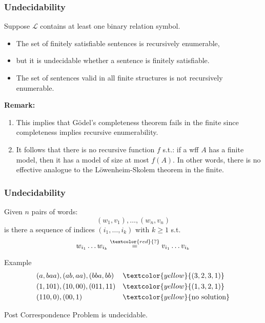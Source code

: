 \documentclass[UTF8,aspectratio=43,11pt,colorlinks,compress,openany]{beamer}%
\begin{document}
\begin{frame}\frametitle{Undecidability}
	\begin{theorem}
		Suppose $\mathscr{L}$ contains at least one binary relation symbol.
		\begin{itemize}
			\item The set of finitely satisfiable sentences is recursively enumerable,
			\item but it is undecidable whether a sentence is finitely satisfiable.
			\item The set of sentences valid in all finite structures is not recursively enumerable.
		\end{itemize}
	\end{theorem}
	\textbf{Remark:}
	\begin{enumerate}
		\item This implies that G\"odel's completeness theorem fails in the finite since completeness implies recursive enumerability.
		\item It follows that there is no recursive function $f$ s.t.: if a wff $A$ has a finite model, then it has a model of size at most $f(A)$. In other words, there is no effective analogue to the L\"owenheim-Skolem theorem in the finite.
	\end{enumerate}
\end{frame}

\begin{frame}\frametitle{Undecidability}\vspace{-1ex}
	\begin{problem}
		Given $n$ pairs of words:
		\[(w_1,v_1),\ldots,(w_n,v_n)\]
		is there a sequence of indices $(i_1,\ldots,i_k)$ with $k\geq 1$ s.t.
		\[w_{i_1}\ldots w_{i_k}\stackrel{\textcolor{red}{?}}{=}v_{i_1}\ldots v_{i_k}\]
	\end{problem}\vspace{-1ex}
\setlength\abovedisplayskip{0pt}
	\begin{block}{Example}
		\begin{align*}
		&(a,baa),(ab,aa),(bba,bb) &&\textcolor{yellow}{(3,2,3,1)}\\
		&(1,101), (10,00), (011,11) &&\textcolor{yellow}{(1,3,2,1)}\\
		&(110,0), (00,1) &&\textcolor{yellow}{\text{no solution}}
		\end{align*}
	\end{block}\vspace{-1ex}
	\begin{theorem}[Post1946]
		Post Correspondence Problem is undecidable.
	\end{theorem}
\end{frame}
\end{document}
